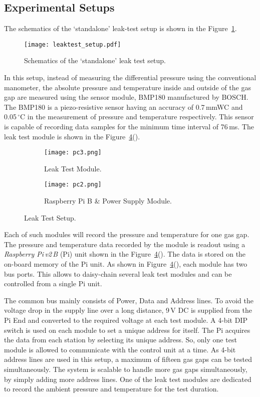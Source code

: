 \subsection{Experimental Setups}
The schematics of the `standalone' leak-test setup is shown in the
Figure~\ref{fig:schematics}. 
\begin{figure}
  \centering
  \texttt{[image: leaktest\_setup.pdf]}
  \caption{Schematics of the `standalone' leak test setup.}
  \label{fig:schematics}
\end{figure}
In this setup, instead of measuring the differential pressure using the
conventional manometer, the absolute pressure and temperature inside and
outside of the gas gap are measured using the sensor module, BMP180
manufactured by BOSCH\cite{bmp180}. The BMP180 is a piezo-resistive sensor
having an accuracy of 0.7\,mmWC and 0.05\,$^{\circ}$C in the measurement of
pressure and temperature respectively. This sensor is capable of recording
data samples for the minimum time interval of 76\,ms. The leak test module is
shown in the Figure~\ref{fig:setup}(). 
\begin{figure}
  \centering
  \begin{subfigure}[b]{0.34\textwidth}
    \texttt{[image: pc3.png]}
    \caption{Leak Test Module.}
    \label{fig:pc3}
  \end{subfigure}
  \begin{subfigure}[b]{0.64\textwidth}
    \texttt{[image: pc2.png]}
    \caption{Raspberry Pi B \& Power Supply Module.}
    \label{fig:pc2}
  \end{subfigure}
  \caption{Leak Test Setup.}
  \label{fig:setup}
\end{figure}
Each of such modules will record the pressure and temperature for one gas gap.
The pressure and temperature data recorded by the module is readout using a
\textit{Raspberry Pi\,v2\,B} (Pi) unit\cite{rpi} shown in the
Figure~\ref{fig:setup}(). The data is stored on the on-board
memory of the Pi unit. As shown in Figure~\ref{fig:setup}(),
each module has two bus ports. This allows to daisy-chain several leak test
modules and can be controlled from a single Pi unit.

The common bus mainly consists of Power, Data and Address lines. To avoid the
voltage drop in the supply line over a long distance, 9\,V DC is supplied from
the Pi End and converted to the required voltage at each test module. A 4-bit
DIP switch is used on each module to set a unique address for itself. The Pi
acquires the data from each station by selecting its unique address. So, only
one test module is allowed to communicate with the control unit at a time.
As 4-bit address lines are used in this setup, a maximum of fifteen gas gaps
can be tested simultaneously. The system is scalable to handle more gas gaps
simultaneously, by simply adding more address lines. One of the leak test
modules are dedicated to record the ambient pressure and temperature for the
test duration.

